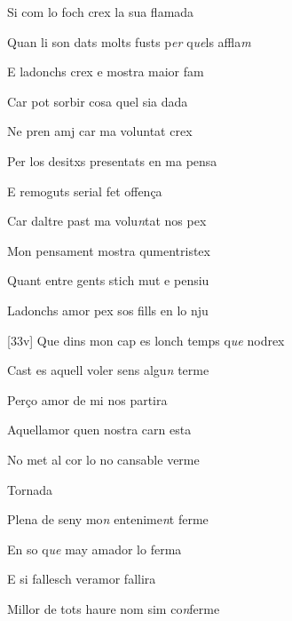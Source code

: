 \documentclass[12pt]{article}
\begin{document}
\begin{estrofa}

 Si com lo foch crex la sua flamada

 Quan li son dats molts fusts p\textit{er} q\textit{ue}ls affla\textit{m}

 E ladonchs crex e mostra maior fam

 Car pot sorbir cosa quel sia dada

 Ne pren amj car ma voluntat crex

 Per los desitxs presentats en ma pensa

 E remoguts serial fet offen\c{c}a

 Car daltre past ma volu\textit{n}tat nos pex

\end{estrofa}



\begin{estrofa}

 Mon pensament mostra qumentristex

 Quant entre gents stich mut e pensiu

 Ladonchs amor pex sos fills en lo nju

 [33v] Que dins mon cap es lonch temps q\textit{ue }nodrex

 Cast es aquell voler sens algu\textit{n} terme

 Per\c{c}o amor de mi nos partira

 Aquellamor quen nostra carn esta

 No met al cor lo no cansable verme

\end{estrofa}


\begin{estrofaExtra}%




\begin{tornada}

Tornada

\end{tornada}


\end{estrofaExtra}


\begin{estrofa}

 Plena de seny mo\textit{n} entenime\textit{n}t ferme

 En so q\textit{ue} may amador lo ferma

 E si fallesch veramor fallira

 Millor de tots haure nom sim co\textit{n}ferme

\end{estrofa}
\end{document}
